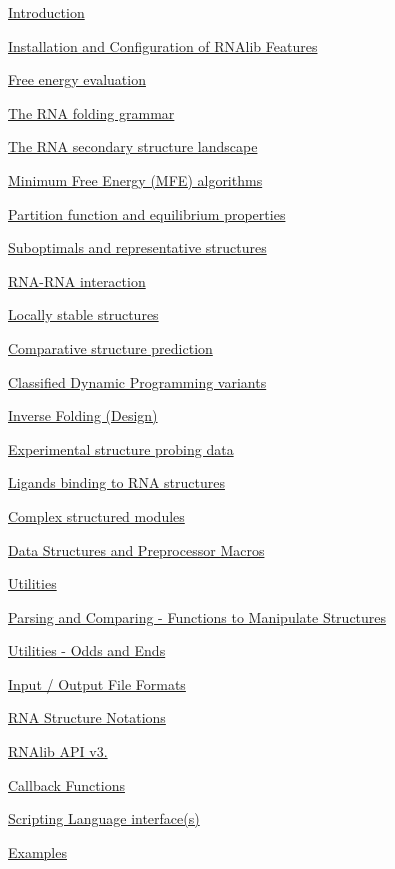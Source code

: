 \begin{DoxyItemize}
\item \hyperlink{index_mp_intro}{Introduction} \item \hyperlink{install}{Installation and Configuration of R\+N\+Alib Features} \item \hyperlink{group__eval}{Free energy evaluation} \item \hyperlink{group__grammar}{The R\+NA folding grammar} \item \hyperlink{group__landscape}{The R\+NA secondary structure landscape} \item \hyperlink{group__mfe__fold}{Minimum Free Energy (M\+FE) algorithms} \item \hyperlink{group__pf__fold}{Partition function and equilibrium properties} \item \hyperlink{group__subopt__and__representatives}{Suboptimals and representative structures} \item \hyperlink{group__cofold}{R\+N\+A-\/\+R\+NA interaction} \item \hyperlink{group__local__fold}{Locally stable structures} \item \hyperlink{group__consensus__fold}{Comparative structure prediction} \item \hyperlink{group__class__fold}{Classified Dynamic Programming variants} \item \hyperlink{group__inverse__fold}{Inverse Folding (Design)} \item \hyperlink{group__probing__data}{Experimental structure probing data} \item \hyperlink{group__ligand__binding}{Ligands binding to R\+NA structures} \item \hyperlink{group__paired__modules}{Complex structured modules} \item \hyperlink{group__data__structures}{Data Structures and Preprocessor Macros} \item \hyperlink{group__utils}{Utilities} \item \hyperlink{mp_parse}{Parsing and Comparing -\/ Functions to Manipulate Structures} \item \hyperlink{mp_utils}{Utilities -\/ Odds and Ends} \item \hyperlink{file_formats}{Input / Output File Formats} \item \hyperlink{rna_structure_notations}{R\+NA Structure Notations} \item \hyperlink{newAPI}{R\+N\+Alib A\+PI v3.} \item \hyperlink{callbacks}{Callback Functions} \item \hyperlink{scripting}{Scripting Language interface(s)} \item \hyperlink{mp_example}{Examples} 

\end{DoxyItemize}
